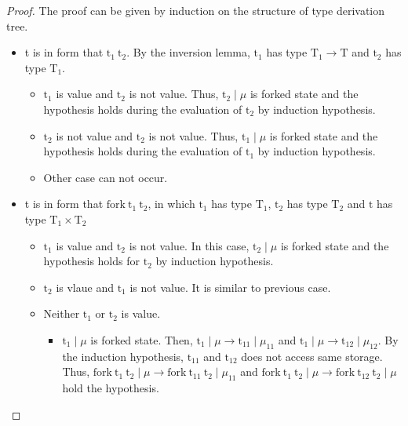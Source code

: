 \documentclass[10pt]{article}
\newcommand{\lto}{\longrightarrow}
\theoremstyle{definition}\newtheorem*{theorem}{Theorem}
\theoremstyle{definition}\newtheorem*{definition}{Definition}
\theoremstyle{definition}\newtheorem*{lemma}{Lemma}
\begin{document}
    \begin{proof}
        The proof can be given by induction on the structure of type derivation tree.
        \begin{itemize}
            \item t is in form that $\mathrm{t_1}\ \mathrm{t_2}$. By the inversion lemma, $\mathrm{t_1}$ has type $\mathrm{T_1}\to\mathrm{T}$ and $\mathrm{t_2}$ has type $\mathrm{T_1}$.
                \begin{itemize}
                    \item $\mathrm{t_1}$ is value and $\mathrm{t_2}$ is not value. Thus, $\mathrm{t_2}\mid\mu$ is forked state and the hypothesis holds during the evaluation of $\mathrm{t_2}$ by induction hypothesis.
                    \item $\mathrm{t_2}$ is not value and $\mathrm{t_2}$ is not value. Thus, $\mathrm{t_1}\mid\mu$ is forked state and the hypothesis holds during the evaluation of $\mathrm{t_1}$ by induction hypothesis.
                    \item Other case can not occur.
                \end{itemize}
            \item t is in form that $\mathrm{fork}\ \mathrm{t_1}\ \mathrm{t_2}$, in which $\mathrm{t_1}$ has type $\mathrm{T_1}$, $\mathrm{t_2}$ has type $\mathrm{T_2}$ and $\mathrm{t}$ has type $\mathrm{T_1}\times\mathrm{T_2}$
                \begin{itemize}
                    \item $\mathrm{t_1}$ is value and $\mathrm{t_2}$ is not value. In this case, $\mathrm{t_2}\mid\mu$ is forked state and the hypothesis holds for $\mathrm{t_2}$ by induction hypothesis.
                    \item $\mathrm{t_2}$ is vlaue and $\mathrm{t_1}$ is not value. It is similar to previous case.
                    \item Neither $\mathrm{t_1}$ or $\mathrm{t_2}$ is value.
                        \begin{itemize}
                            \item $\mathrm{t_1}\mid\mu$ is forked state. Then, $\mathrm{t_1}\mid\mu\lto\mathrm{t_{11}}\mid\mu_{11}$ and $\mathrm{t_1}\mid\mu\lto\mathrm{t_{12}}\mid\mu_{12}$. By the induction hypothesis, $\mathrm{t_{11}}$ and $\mathrm{t_{12}}$ does not access same storage.
                                Thus, $\mathrm{fork}\ \mathrm{t_1}\ \mathrm{t_2}\mid\mu\lto\mathrm{fork}\ \mathrm{t_{11}}\ \mathrm{t_2}\mid\mu_{11}$ and $\mathrm{fork}\ \mathrm{t_1}\ \mathrm{t_2}\mid\mu\lto\mathrm{fork}\ \mathrm{t_{12}}\ \mathrm{t_2}\mid\mu$ hold the hypothesis.

\end{itemize}
\end{itemize}
\end{itemize}
\end{proof}
\end{document}
